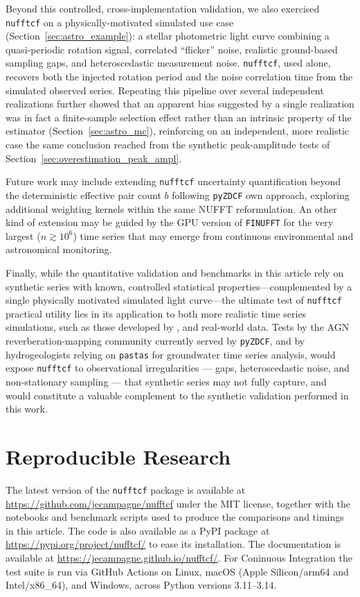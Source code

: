 \documentclass[twocolumn,10pt]{article}
\newcommand{\nufftcf}{\texttt{nufftcf}\xspace}
\newcommand{\pastas}{\texttt{pastas}\xspace}
\newcommand{\pyzdcf}{\texttt{pyZDCF}\xspace}
\begin{document}
Beyond this controlled, cross-implementation validation, we also
exercised \nufftcf on a physically-motivated simulated use case
(Section~\ref{sec:astro_example}): a stellar photometric light curve
combining a quasi-periodic rotation signal, correlated ``flicker''
noise, realistic ground-based sampling gaps, and heteroscedastic
measurement noise. \nufftcf, used alone, recovers both the injected
rotation period and the noise correlation time from the simulated
observed series. Repeating this pipeline over several
independent realizations further showed that an apparent bias
suggested by a single realization was in fact a finite-sample
selection effect rather than an intrinsic property of the estimator
(Section~\ref{sec:astro_mc}), reinforcing on an independent, more
realistic case the same conclusion reached from the synthetic
peak-amplitude tests of Section~\ref{sec:overestimation_peak_ampl}.

Future work may include extending \nufftcf uncertainty quantification
beyond the deterministic effective pair count $b$ following \pyzdcf own
approach, exploring additional weighting kernels within the same
NUFFT reformulation. An other kind of extension may be guided
by the GPU version of \texttt{FINUFFT} \citep{cuFINUFFT2021}  for
the very largest ($n\gtrsim10^6$) time series that may emerge from
continuous environmental and astronomical monitoring. 

Finally, while the quantitative validation and benchmarks in this article rely on synthetic series with known, controlled statistical properties---complemented by a single physically motivated simulated light curve---the ultimate test of \nufftcf practical utility lies in its application to both more realistic time series simulations, such as those developed by \cite{Emmanoulopoulos2013}, and real-world data.  Tests by the AGN reverberation-mapping community currently
served by \pyzdcf, and by hydrogeologists relying on \pastas for
groundwater time series analysis, would expose \nufftcf to
observational irregularities --- gaps, heteroscedastic noise, and
non-stationary sampling --- that synthetic series may not fully
capture, and would constitute a valuable complement to the synthetic
validation performed in this work.
%
\section{Reproducible Research}
\label{sec:data_availability}
The latest version of the \nufftcf package is available at
\url{https://github.com/jecampagne/nufftcf} under the MIT license, together with the
notebooks and benchmark scripts used to produce the comparisons and timings in
this article. The code is also available as a PyPI package at
\url{https://pypi.org/project/nufftcf/} to ease its installation. The documentation
is available at \url{https://jecampagne.github.io/nufftcf/}. For Coninuous Integration 
the test suite is run via GitHub Actions on Linux, macOS (Apple Silicon/arm64 and Intel/x86\_64), and Windows, across Python versions 3.11–3.14.
\end{document}
